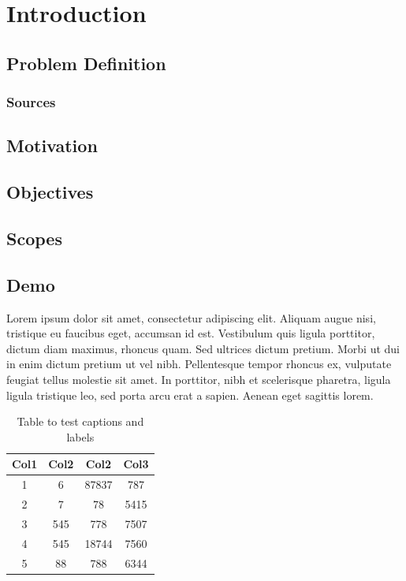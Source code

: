 \chapter{Introduction}
\label{chap:Introduction}

\section{Problem Definition}
\label{sec:Problem Definition}

\subsection{Sources}
\label{sub:Sources}

\section{Motivation}
\label{sec:Motivation}

\section{Objectives}
\label{sec:Objectives}

\section{Scopes}
\label{sec:Scopes}


\section{Demo}
\label{sec:Demo}

Lorem ipsum dolor sit amet, consectetur adipiscing elit. Aliquam augue nisi,
tristique eu faucibus eget, accumsan id est. Vestibulum quis ligula porttitor,
dictum diam maximus, rhoncus quam. Sed ultrices dictum pretium. Morbi ut dui in
enim dictum \cite{latexcompanion} pretium ut vel nibh. Pellentesque tempor rhoncus ex, vulputate
feugiat tellus molestie sit amet. In porttitor, nibh et scelerisque pharetra,
ligula ligula tristique leo, sed porta arcu erat a sapien. Aenean eget sagittis
lorem.

\begin{table}[h!]
    \centering
    \begin{tabular}{|c c c c|}
        \hline
        Col1 & Col2 & Col2 & Col3 \\
        \hline
        1 & 6 & 87837 & 787 \\
        2 & 7 & 78 & 5415 \\
        3 & 545 & 778 & 7507 \\
        4 & 545 & 18744 & 7560 \\
        5 & 88 & 788 & 6344 \\
        \hline
    \end{tabular}
    \caption{Table to test captions and labels}
    \label{table}
\end{table}


